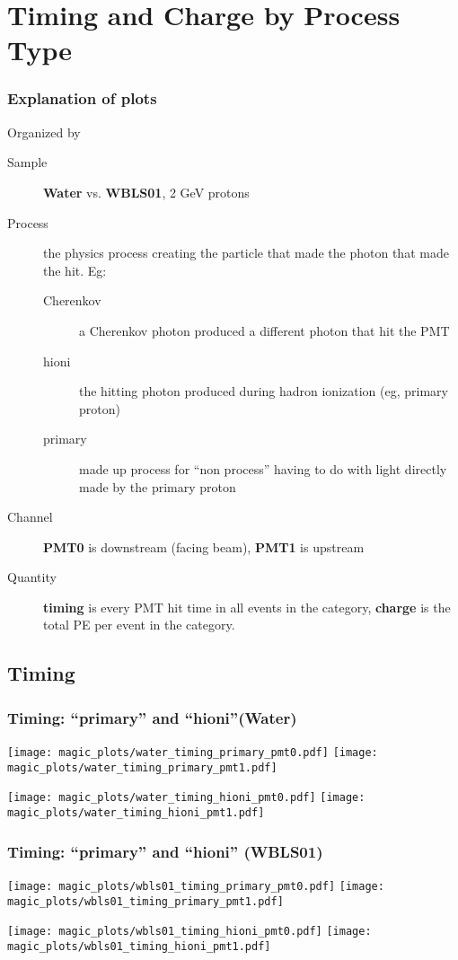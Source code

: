 \documentclass[xcolor=dvipsnames]{beamer}
\begin{document}
\section{Timing and Charge by Process Type}

\begin{frame}
  \frametitle{Explanation of plots}
  Organized by 
  \begin{description}
  \item[Sample] \textbf{Water} vs. \textbf{WBLS01}, 2 GeV protons
  \item[Process] the physics process creating the particle that made
    the photon that made the hit.  Eg:
    \begin{description}
    \item[Cherenkov] a Cherenkov photon produced a different photon that hit the PMT
    \item[hioni] the hitting photon produced during hadron ionization (eg, primary proton)
    \item[primary] made up process for ``non process'' having to do with light directly made by the primary proton
    \end{description}
  \item[Channel] \textbf{PMT0} is downstream (facing beam), \textbf{PMT1} is upstream
  \item[Quantity] \textbf{timing} is every PMT hit time in all events in the category, \textbf{charge} is the total PE per event in the category.
  \end{description}
\end{frame}



\subsection{Timing}

\begin{frame}[fragile]
  \frametitle{Timing:  ``primary'' and ``hioni''(Water)}

\texttt{[image: magic\_plots/water\_timing\_primary\_pmt0.pdf]}%
\texttt{[image: magic\_plots/water\_timing\_primary\_pmt1.pdf]}%

\texttt{[image: magic\_plots/water\_timing\_hioni\_pmt0.pdf]}%
\texttt{[image: magic\_plots/water\_timing\_hioni\_pmt1.pdf]}%
\end{frame}

\begin{frame}[fragile]
  \frametitle{Timing: ``primary'' and ``hioni'' (WBLS01)}

\texttt{[image: magic\_plots/wbls01\_timing\_primary\_pmt0.pdf]}%
\texttt{[image: magic\_plots/wbls01\_timing\_primary\_pmt1.pdf]}%

\texttt{[image: magic\_plots/wbls01\_timing\_hioni\_pmt0.pdf]}%
\texttt{[image: magic\_plots/wbls01\_timing\_hioni\_pmt1.pdf]}%
\end{frame}
\end{document}
